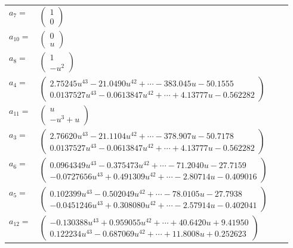 \documentclass[1p]{elsarticle_modified}
\theoremstyle{definition}
\begin{document}
\begin{tabular}{m{7pt} m{180pt} m{7pt} m{180pt} }
\flushright $a_{7}=$&$\begin{pmatrix}1\\0\end{pmatrix}$ \\
\flushright $a_{10}=$&$\begin{pmatrix}0\\u\end{pmatrix}$ \\
\flushright $a_{8}=$&$\begin{pmatrix}1\\- u^2\end{pmatrix}$ \\
\flushright $a_{4}=$&$\begin{pmatrix}2.75245 u^{43}-21.0490 u^{42}+\cdots-383.045 u-50.1555\\0.0137527 u^{43}-0.0613847 u^{42}+\cdots+4.13777 u-0.562282\end{pmatrix}$ \\
\flushright $a_{11}=$&$\begin{pmatrix}u\\- u^3+u\end{pmatrix}$ \\
\flushright $a_{3}=$&$\begin{pmatrix}2.76620 u^{43}-21.1104 u^{42}+\cdots-378.907 u-50.7178\\0.0137527 u^{43}-0.0613847 u^{42}+\cdots+4.13777 u-0.562282\end{pmatrix}$ \\
\flushright $a_{6}=$&$\begin{pmatrix}0.0964349 u^{43}-0.375473 u^{42}+\cdots-71.2040 u-27.7159\\-0.0727656 u^{43}+0.491309 u^{42}+\cdots-2.80714 u-0.409016\end{pmatrix}$ \\
\flushright $a_{5}=$&$\begin{pmatrix}0.102399 u^{43}-0.502049 u^{42}+\cdots-78.0105 u-27.7938\\-0.0451246 u^{43}+0.308080 u^{42}+\cdots-2.57914 u-0.402041\end{pmatrix}$ \\
\flushright $a_{12}=$&$\begin{pmatrix}-0.130388 u^{43}+0.959055 u^{42}+\cdots+40.6420 u+9.41950\\0.122234 u^{43}-0.687069 u^{42}+\cdots+11.8008 u+0.252623\end{pmatrix}$ \\

\end{tabular}
\end{document}
